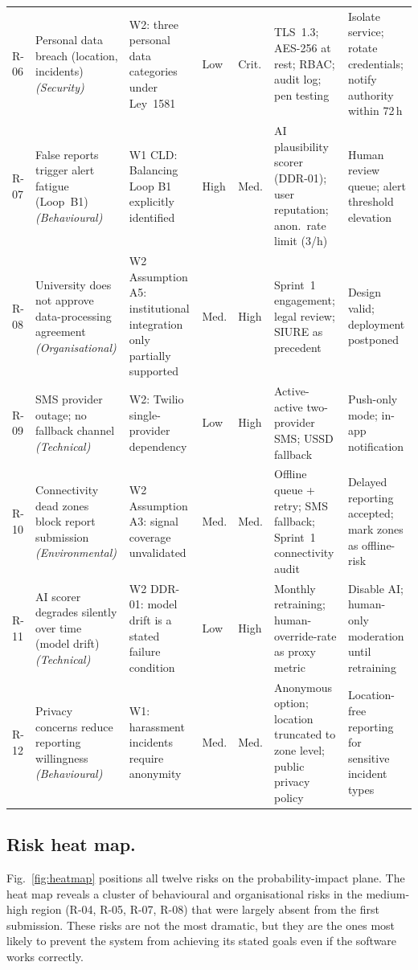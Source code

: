 \documentclass[12pt,a4paper]{article}
\begin{document}
{\begin{longtable}{p{0.5cm}p{4.2cm}p{2.8cm}p{0.9cm}p{0.9cm}p{3.5cm}p{2.5cm}}
R-06 & Personal data breach (location, incidents) \textit{(Security)} & W2: three personal data categories under Ley~1581 & Low & Crit. & TLS~1.3; AES-256 at rest; RBAC; audit log; pen testing & Isolate service; rotate credentials; notify authority within 72\,h \\[4pt]

R-07 & False reports trigger alert fatigue (Loop~B1) \textit{(Behavioural)} & W1 CLD: Balancing Loop B1 explicitly identified & High & Med. & AI plausibility scorer (DDR-01); user reputation; anon.\ rate limit (3/h) & Human review queue; alert threshold elevation \\[4pt]

R-08 & University does not approve data-processing agreement \textit{(Organisational)} & W2 Assumption A5: institutional integration only partially supported & Med. & High & Sprint~1 engagement; legal review; SIURE as precedent & Design valid; deployment postponed \\[4pt]

R-09 & SMS provider outage; no fallback channel \textit{(Technical)} & W2: Twilio single-provider dependency & Low & High & Active-active two-provider SMS; USSD fallback & Push-only mode; in-app notification \\[4pt]

R-10 & Connectivity dead zones block report submission \textit{(Environmental)} & W2 Assumption A3: signal coverage unvalidated & Med. & Med. & Offline queue + retry; SMS fallback; Sprint~1 connectivity audit & Delayed reporting accepted; mark zones as offline-risk \\[4pt]

R-11 & AI scorer degrades silently over time (model drift) \textit{(Technical)} & W2 DDR-01: model drift is a stated failure condition & Low & High & Monthly retraining; human-override-rate as proxy metric & Disable AI; human-only moderation until retraining \\[4pt]

R-12 & Privacy concerns reduce reporting willingness \textit{(Behavioural)} & W1: harassment incidents require anonymity & Med. & Med. & Anonymous option; location truncated to zone level; public privacy policy & Location-free reporting for sensitive incident types \\[4pt]
\end{longtable}
}%

\subsection{Risk heat map.}
Fig.~\ref{fig:heatmap} positions all twelve risks on the
probability-impact plane. The heat map reveals a cluster of
behavioural and organisational risks in the medium-high region
(R-04, R-05, R-07, R-08) that were largely absent from the
first submission. These risks are not the most dramatic, but
they are the ones most likely to prevent the system from
achieving its stated goals even if the software works correctly.
\end{document}
